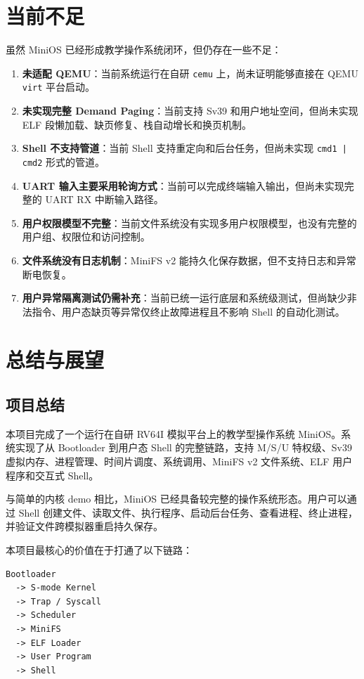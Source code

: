 \documentclass[UTF8,a4paper,12pt,openany,fontset=fandol]{ctexrep}
\begin{document}
\chapter{当前不足}

虽然 MiniOS 已经形成教学操作系统闭环，但仍存在一些不足：

\begin{enumerate}
\item \textbf{未适配 QEMU}：当前系统运行在自研 \nolinkurl{cemu} 上，尚未证明能够直接在 QEMU \nolinkurl{virt} 平台启动。
\item \textbf{未实现完整 Demand Paging}：当前支持 Sv39 和用户地址空间，但尚未实现 ELF 段懒加载、缺页修复、栈自动增长和换页机制。
\item \textbf{Shell 不支持管道}：当前 Shell 支持重定向和后台任务，但尚未实现 \nolinkurl{cmd1 | cmd2} 形式的管道。
\item \textbf{UART 输入主要采用轮询方式}：当前可以完成终端输入输出，但尚未实现完整的 UART RX 中断输入路径。
\item \textbf{用户权限模型不完整}：当前文件系统没有实现多用户权限模型，也没有完整的用户组、权限位和访问控制。
\item \textbf{文件系统没有日志机制}：MiniFS v2 能持久化保存数据，但不支持日志和异常断电恢复。
\item \textbf{用户异常隔离测试仍需补充}：当前已统一运行底层和系统级测试，但尚缺少非法指令、用户态缺页等异常仅终止故障进程且不影响 Shell 的自动化测试。
\end{enumerate}

\chapter{总结与展望}

\section{项目总结}

本项目完成了一个运行在自研 RV64I 模拟平台上的教学型操作系统 MiniOS。系统实现了从 Bootloader 到用户态 Shell 的完整链路，支持 M/S/U 特权级、Sv39 虚拟内存、进程管理、时间片调度、系统调用、MiniFS v2 文件系统、ELF 用户程序和交互式 Shell。

与简单的内核 demo 相比，MiniOS 已经具备较完整的操作系统形态。用户可以通过 Shell 创建文件、读取文件、执行程序、启动后台任务、查看进程、终止进程，并验证文件跨模拟器重启持久保存。

本项目最核心的价值在于打通了以下链路：

\begin{lstlisting}
Bootloader
  -> S-mode Kernel
  -> Trap / Syscall
  -> Scheduler
  -> MiniFS
  -> ELF Loader
  -> User Program
  -> Shell
\end{lstlisting}
\end{document}
